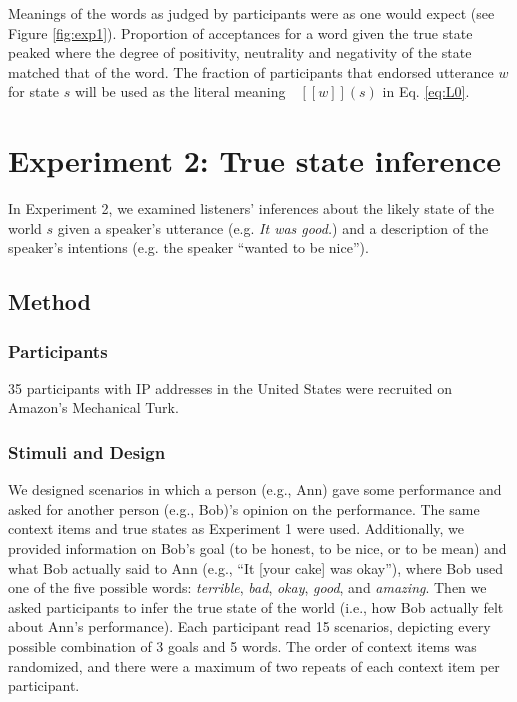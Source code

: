 \documentclass[10pt,letterpaper]{article}
\newcommand{\denote}[1]{\mbox{ $[\![ #1 ]\!]$}}
\begin{document}
Meanings of the words as judged by participants were as one would expect (see Figure \ref{fig:exp1}).
Proportion of acceptances for a word given the true state peaked where the degree of positivity, neutrality and negativity of the state matched that of the word.
The fraction of participants that endorsed utterance $w$ for state $s$ will be used as the literal meaning $\denote{w}(s)$ in Eq. \ref{eq:L0}.


\section{Experiment 2: True state inference}

In Experiment 2, we examined listeners' inferences about the likely state of the world $s$ given a speaker's utterance (e.g. \emph{It was good.}) and a description of the speaker's intentions (e.g. the speaker ``wanted to be nice'').

\subsection{Method}

\subsubsection{Participants}

35 participants with IP addresses in the United States were recruited on Amazon's Mechanical Turk.


\subsubsection{Stimuli and Design}

We designed scenarios in which a person (e.g., Ann) gave some performance and asked for another person (e.g., Bob)'s opinion on the performance. The same context items and true states as Experiment 1 were used. Additionally, we provided information on Bob's goal (to be honest, to be nice, or to be mean) and what Bob actually said to Ann (e.g., ``It [your cake] was okay''), where Bob used one of the five possible words: \emph{terrible}, \emph{bad}, \emph{okay}, \emph{good}, and \emph{amazing}. Then we asked participants to infer the true state of the world (i.e., how Bob actually felt about Ann's performance). Each participant read 15 scenarios, depicting every possible combination of 3 goals and 5 words. The order of context items was randomized, and there were a maximum of two repeats of each context item per participant.
\end{document}
